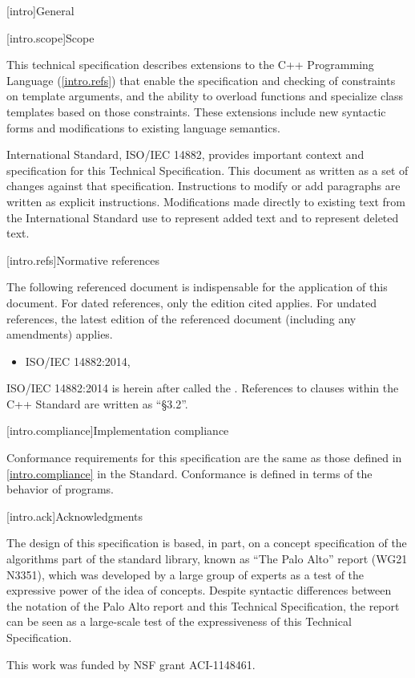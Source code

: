 
[intro]{General}

[intro.scope]{Scope}

\pnum
This technical specification describes extensions to the C++ 
Programming Language (\ref{intro.refs}) that
enable the specification and checking of constraints on template 
arguments, and the ability to overload functions and specialize
class templates based on those constraints. These extensions include 
new syntactic forms and modifications to existing language semantics.

\pnum
International Standard, ISO/IEC 14882, provides important context
and specification for this Technical Specification. This document as 
written as a set of changes against that specification. Instructions
to modify or add paragraphs are written as explicit instructions. 
Modifications made directly to existing text from the International
Standard use  to represent added text and
 to represent deleted text.


[intro.refs]{Normative references}

\pnum
The following referenced document is indispensable for the
application of this document. For dated references, only the
edition cited applies. For undated references, the latest edition
of the referenced document (including any amendments) applies.
\begin{itemize}
\item ISO/IEC 14882:2014, 
\end{itemize}
% 
ISO/IEC 14882:2014 is herein after called the .
References to clauses within the C++ Standard are written as ``\Cpp \S 3.2''.

[intro.compliance]{Implementation compliance}

\pnum
Conformance requirements for this specification are the same as those 
defined in \ref{intro.compliance} in the \Cpp Standard.
\enternote 
Conformance is defined in terms of the behavior of programs.
\exitnote


[intro.ack]{Acknowledgments}

\pnum
The design of this specification is based, in part, on a concept 
specification of the algorithms part of the \Cpp standard library, known 
as ``The Palo Alto'' report (WG21 N3351), which was developed by a large 
group of experts as a test of the expressive power of the idea of 
concepts. Despite syntactic differences between the notation of the 
Palo Alto report and this Technical Specification, the report can be seen as a 
large-scale test of the expressiveness of this Technical Specification.

\pnum
This work was funded by NSF grant ACI-1148461.
